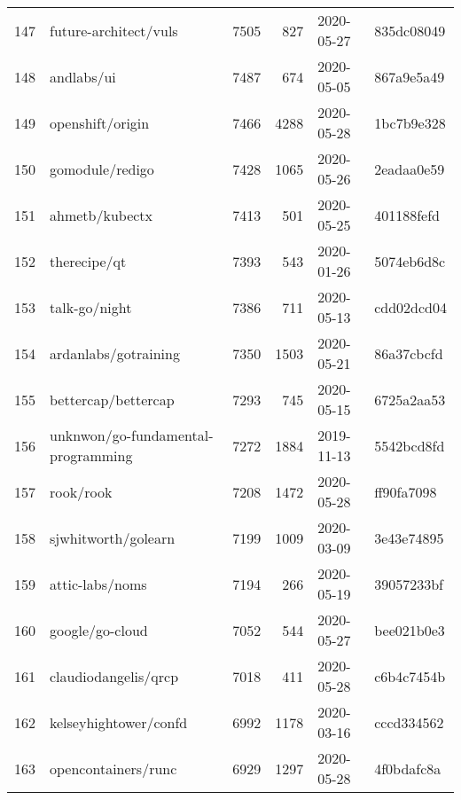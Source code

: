 \begin{footnotesize}
\begin{longtable}{llrrll}
        147 &                              future-architect/vuls &   7505 &    827 & 2020-05-27 &  835dc08049 \\
        148 &                                         andlabs/ui &   7487 &    674 & 2020-05-05 &  867a9e5a49 \\
        149 &                                   openshift/origin &   7466 &   4288 & 2020-05-28 &  1bc7b9e328 \\
        150 &                                    gomodule/redigo &   7428 &   1065 & 2020-05-26 &  2eadaa0e59 \\
        151 &                                     ahmetb/kubectx &   7413 &    501 & 2020-05-25 &  401188fefd \\
        152 &                                       therecipe/qt &   7393 &    543 & 2020-01-26 &  5074eb6d8c \\
        153 &                                      talk-go/night &   7386 &    711 & 2020-05-13 &  cdd02dcd04 \\
        154 &                               ardanlabs/gotraining &   7350 &   1503 & 2020-05-21 &  86a37cbcfd \\
        155 &                                bettercap/bettercap &   7293 &    745 & 2020-05-15 &  6725a2aa53 \\
        156 &                 unknwon/go-fundamental-programming &   7272 &   1884 & 2019-11-13 &  5542bcd8fd \\
        157 &                                          rook/rook &   7208 &   1472 & 2020-05-28 &  ff90fa7098 \\
        158 &                                sjwhitworth/golearn &   7199 &   1009 & 2020-03-09 &  3e43e74895 \\
        159 &                                    attic-labs/noms &   7194 &    266 & 2020-05-19 &  39057233bf \\
        160 &                                    google/go-cloud &   7052 &    544 & 2020-05-27 &  bee021b0e3 \\
        161 &                               claudiodangelis/qrcp &   7018 &    411 & 2020-05-28 &  c6b4c7454b \\
        162 &                              kelseyhightower/confd &   6992 &   1178 & 2020-03-16 &  cccd334562 \\
        163 &                                opencontainers/runc &   6929 &   1297 & 2020-05-28 &  4f0bdafc8a \\

\end{longtable}
\end{footnotesize}
